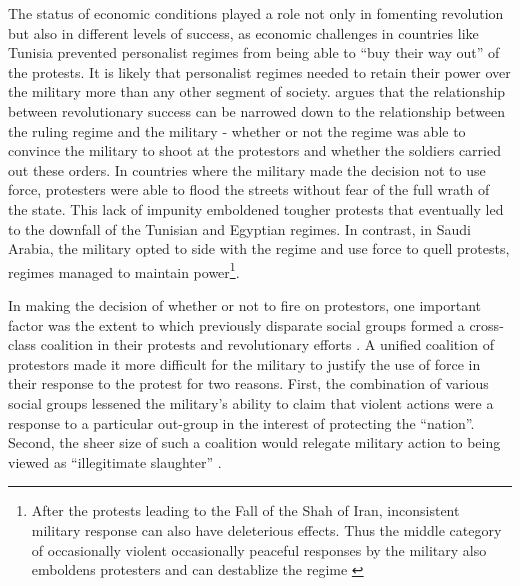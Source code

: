 The status of economic conditions played a role not only in fomenting revolution but also in different levels of success, as economic challenges in countries like Tunisia prevented personalist regimes from being able to “buy their way out” of the protests. It is likely that personalist regimes needed to retain their power over the military more than any other segment of society\cite{comunello_will_2012,battera_perspectives_2014}.  \cite{bellin_reconsidering_2012} argues that the relationship between revolutionary success can be narrowed down to the relationship between the ruling regime and the military - whether or not the regime was able to convince the military to shoot at the protestors and whether the soldiers carried out these orders. In countries where the military made the decision not to use force, protesters were able to flood the streets without fear of the full wrath of the state. This lack of impunity emboldened tougher protests that eventually led to the downfall of the Tunisian and Egyptian regimes. In contrast, in Saudi Arabia, the military opted to side with the regime and use force to quell protests, regimes managed to maintain power\footnote{After the protests leading to the Fall of the Shah of Iran, inconsistent military response can also have deleterious effects. Thus the middle category of occasionally violent occasionally peaceful responses by the military also emboldens protesters and can destablize the regime \cite{sick_all_1985}}.

In making the decision of whether or not to fire on protestors, one important factor was  the extent to which previously disparate social groups formed a cross-class coalition in their protests and revolutionary efforts \cite{goldstone_cross-class_2011}.  A unified coalition of protestors made it more difficult for the military to justify the use of force in their response to the protest for two reasons. First, the combination of various social groups lessened the military's ability to claim that violent actions were a response to a particular out-group in the interest of protecting the ``nation''.  Second, the sheer size of such a coalition would relegate military action to being viewed as ``illegitimate slaughter'' \cite[][pg. 132]{bellin_reconsidering_2012}.  

